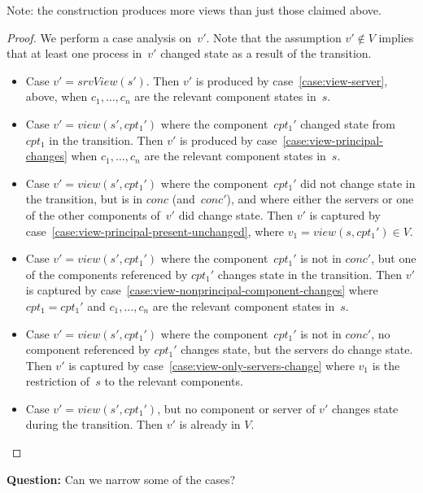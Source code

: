 Note: the construction produces more views than just those claimed above. 

\begin{proof}
We perform a case analysis on~$v'$.  Note that the assumption $v' \nin V$
implies that at least one process in~$v'$ changed state as a result of the
transition. 
%
\begin{itemize}
\item Case $v' = srvView(s')$.  Then $v'$ is produced by
  case~\ref{case:view-server}, above, when $c_1,\ldots,c_n$ are the relevant
  component states in~$s$.  

\item Case $v' = view(s', cpt_1')$ where the component~$cpt_1'$ changed state
  from $cpt_1$ in the transition.  Then $v'$ is produced by
  case~\ref{case:view-principal-changes}  when $c_1,\ldots,c_n$ are the
  relevant component states in~$s$.

\item Case $v' = view(s', cpt_1')$ where the component~$cpt_1'$ did not change
  state in the transition, but is in $conc$ (and~$conc'$), and where either
  the servers or one of the other components of~$v'$ did change state.  Then
  $v'$ is captured by case~\ref{case:view-principal-present-unchanged}, where
  $v_1 = view(s, cpt_1') \in V$. 

\item Case $v' = view(s', cpt_1')$ where the component~$cpt_1'$ is not in
  $conc'$, but one of the components referenced by $cpt_1'$ changes state in
  the transition.  Then $v'$ is captured by
  case~\ref{case:view-nonprincipal-component-changes} where $cpt_1 = cpt_1'$
  and $c_1,\ldots,c_n$ are the relevant component states in~$s$.

\item  Case $v' = view(s', cpt_1')$ where the component~$cpt_1'$ is not in
  $conc'$, no component referenced by $cpt_1'$ changes state, but the servers
  do change state.  Then $v'$ is captured by
  case~\ref{case:view-only-servers-change} where $v_1$ is the restriction
  of~$s$ to the relevant components.

\item Case $v' = view(s', cpt_1')$, but no component or server of $v'$ changes
  state during the transition.  Then $v'$ is already in $V$.
\end{itemize}
\end{proof}


\textbf{Question:} Can we narrow some of the cases?



